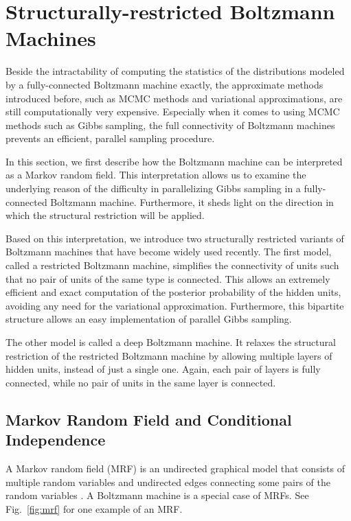 \documentclass[dissertation,nocontribution]{aaltoseries}
\begin{document}
\section{Structurally-restricted Boltzmann Machines}
\label{sec:srbm}

Beside the intractability of computing the statistics of the
distributions modeled by a fully-connected Boltzmann machine
exactly, the approximate methods introduced before, such as
MCMC methods and variational approximations, are still
computationally very expensive. Especially when it comes to
using MCMC methods such as Gibbs sampling, the full
connectivity of Boltzmann machines prevents an efficient,
parallel sampling procedure.

In this section, we first describe how the Boltzmann machine
can be interpreted as a Markov random field. This
interpretation allows us to examine the underlying reason of
the difficulty in parallelizing Gibbs sampling in a
fully-connected Boltzmann machine. Furthermore, it sheds
light on the
direction in which the structural restriction will be applied.

Based on this interpretation, we introduce two structurally
restricted variants of Boltzmann machines that have become
widely used recently. The first model, called a restricted
Boltzmann machine, simplifies the connectivity of units such
that no pair of units of the same type is connected. This
allows an extremely efficient and exact computation of the
posterior probability of the hidden units, avoiding any need
for the variational approximation. Furthermore, this
bipartite structure allows an easy implementation of
parallel Gibbs sampling.

The other model is called a deep Boltzmann machine. It
relaxes the structural restriction of the restricted
Boltzmann machine by allowing multiple layers of hidden
units, instead of just a single one. Again, each pair of
layers is fully connected, while no pair of units in the
same layer is connected.


\subsection{Markov Random Field and Conditional
Independence}
\label{sec:mrf}

A Markov random field (MRF) is an undirected graphical model
that consists of multiple random variables and undirected
edges connecting some pairs of the random variables
\citep[see, e.g.,][]{Kindermann1980}. A Boltzmann machine is
a special case of MRFs. See Fig.~\ref{fig:mrf} for one
example of an MRF.
\end{document}
